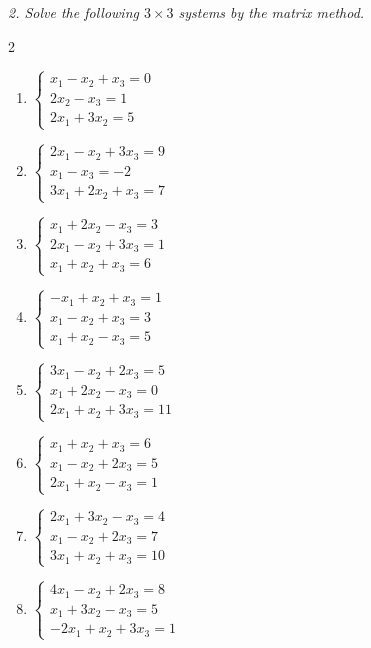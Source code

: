 \emph{2. Solve the following $3\times 3$ systems by the matrix method.}
\bigskip
\begin{multicols}{2}\raggedright
\begin{enumerate}[label=\arabic*., leftmargin=*]

\item $\begin{cases}x_1-x_2+x_3=0\\2x_2-x_3=1\\2x_1+3x_2=5\end{cases}$

\item $\begin{cases}2x_1-x_2+3x_3=9\\x_1-x_3=-2\\3x_1+2x_2+x_3=7\end{cases}$

\item $\begin{cases}x_1+2x_2-x_3=3\\2x_1-x_2+3x_3=1\\x_1+x_2+x_3=6\end{cases}$

\item $\begin{cases}-x_1+x_2+x_3=1\\x_1-x_2+x_3=3\\x_1+x_2-x_3=5\end{cases}$

\item $\begin{cases}3x_1-x_2+2x_3=5\\x_1+2x_2-x_3=0\\2x_1+x_2+3x_3=11\end{cases}$

\item $\begin{cases}x_1+x_2+x_3=6\\x_1-x_2+2x_3=5\\2x_1+x_2-x_3=1\end{cases}$

\item $\begin{cases}2x_1+3x_2-x_3=4\\x_1-x_2+2x_3=7\\3x_1+x_2+x_3=10\end{cases}$

\item $\begin{cases}4x_1-x_2+2x_3=8\\x_1+3x_2-x_3=5\\-2x_1+x_2+3x_3=1\end{cases}$


\end{enumerate}
\end{multicols}
